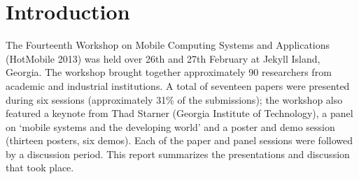 \section{Introduction}
\label{sec:introduction}

The Fourteenth Workshop on Mobile Computing Systems and Applications (HotMobile 
2013) was held over 26th and 27th February at Jekyll Island, Georgia. The workshop 
brought together approximately 90 researchers from academic and industrial 
institutions. A total of seventeen papers were presented during six
sessions (approximately 31\% of the submissions); the workshop
also featured a keynote from  Thad Starner (Georgia Institute of
Technology), a panel on `mobile systems and the developing world' and a
poster and demo session (thirteen posters, six demos). Each of the paper and
panel sessions were followed by a discussion period. This report summarizes the
presentations and discussion that took place.